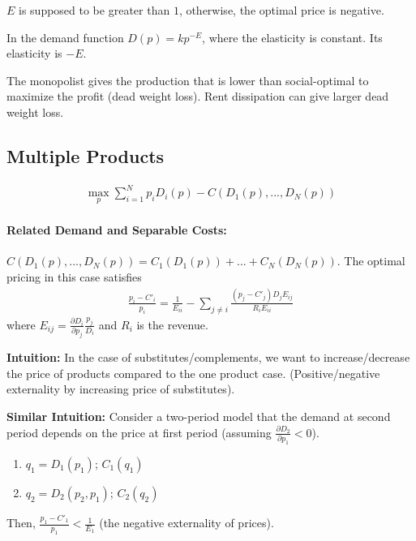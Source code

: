 \documentclass[11pt]{elegantbook}
\begin{document}
$E$ is supposed to be greater than $1$, otherwise, the optimal price is negative.

In the demand function $D(p)=kp^{-E}$, where the elasticity is constant. Its elasticity is $-E$.


The monopolist gives the production that is lower than social-optimal to maximize the profit (dead weight loss). Rent dissipation can give larger dead weight loss.

\subsection{Multiple Products}
\begin{equation}
    \begin{aligned}
        \max_{p}\sum_{i=1}^N p_i D_i(p)-C(D_1(p),...,D_N(p))
    \end{aligned}
    \nonumber
\end{equation}
\paragraph*{Related Demand and Separable Costs:} $C(D_1(p),...,D_N(p))=C_1(D_1(p))+...+C_N(D_N(p))$. The optimal pricing in this case satisfies
\begin{equation}
    \begin{aligned}
        \frac{p_i-C'_i}{p_i}=\frac{1}{E_{ii}}-\sum_{j\neq i}\frac{(p_j-C'_j)D_j E_{ij}}{R_i E_{ii}}
    \end{aligned}
    \nonumber
\end{equation}
where $E_{ij}=\frac{\partial D_i}{\partial p_j}\frac{p_j}{D_i}$ and $R_i$ is the revenue.

\textbf{Intuition:} In the case of substitutes/complements, we want to increase/decrease the price of products compared to the one product case. (Positive/negative externality by increasing price of substitutes).


\textbf{Similar Intuition:}
Consider a two-period model that the demand at second period depends on the price at first period (assuming $\frac{\partial D_2}{\partial p_1}<0$).
\begin{enumerate}
    \item $q_1=D_1(p_1)$; $C_1(q_1)$
    \item $q_2=D_2(p_2,p_1)$; $C_2(q_2)$
\end{enumerate}
Then, $\frac{p_1-C'_1}{p_1}<\frac{1}{E_1}$ (the negative externality of prices).
\end{document}
